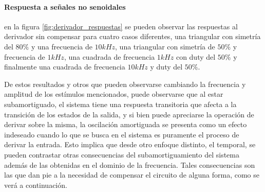 \paragraph*{Respuesta a señales no senoidales} en la figura \ref{fig:derivador_respuestas} se pueden observar las respuestas
al derivador sin compensar para cuatro casos diferentes, una triangular con simetr\'ia del $80\%$ y una frecuencia de $10kHz$,
una triangular con simetr\'ia de $50\%$ y frecuencia de $1kHz$, una cuadrada de frecuencia $1kHz$ con duty del $50\%$ y finalmente una cuadrada
de frecuencia $10kHz$ y duty del $50\%$.

De estos resultados y otros que pueden observarse cambiando la frecuencia y amplitud de los est\'imulos mencionados, puede observarse que al estar subamortiguado,
el sistema tiene una respuesta transitoria que afecta a la transici\'on de los estados de la salida, y si bien puede apreciarse la operaci\'on de derivar sobre la misma,
la oscilaci\'on amortiguada se presenta como un efecto indeseado cuando lo que se busca en el sistema es puramente el proceso de derivar la entrada. Esto implica que desde otro enfoque distinto,
el temporal, se pueden contrastar otras consecuencias del subamortiguamiento del sistema adem\'as de las obtenidas en el dominio de la frecuencia. Tales consecuencias son las que dan pie a la necesidad
de compensar el circuito de alguna forma, como se ver\'a a continuaci\'on.


